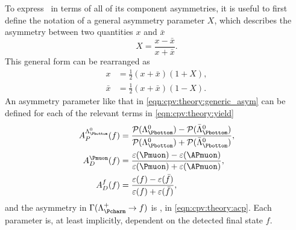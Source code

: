 To express \ARaw\ in terms of all of its component asymmetries, it is useful to 
first define the notation of a general asymmetry parameter $X$, which describes 
the asymmetry between two quantities $x$ and $\bar{x}$
\begin{equation}
  X = \frac{x - \bar{x}}{x + \bar{x}}.
  \label{eqn:cpv:theory:generic_asym}
\end{equation}
This general form can be rearranged as
\begin{align}
  x &= \frac{1}{2}(x + \bar{x})(1 + X),\label{eqn:cpv:theory:asym_form_one}\\
  \bar{x} &= \frac{1}{2}(x + \bar{x})(1 - X).\label{eqn:cpv:theory:asym_form_two}
\end{align}
An asymmetry parameter like that in \cref{eqn:cpv:theory:generic_asym} can be defined for each of the relevant terms in 
\cref{eqn:cpv:theory:yield}
\begin{align*}
  \APLb(f) &= \frac{%
    \prob(\PLambdab) - \prob(\APLambdab)
  }{%
    \prob(\PLambdab) + \prob(\APLambdab)
  },\\
  \ADmu(f) &= \frac{%
    \eff(\Pmuon) - \eff(\APmuon)
  }{%
    \eff(\Pmuon) + \eff(\APmuon)
  },\\
  \ADf(f)  &= \frac{%
    \eff(f) - \eff(\bar{f})
  }{%
    \eff(f) + \eff(\bar{f})
  },
\end{align*}
and the asymmetry in $\Gamma(\LcTof)$ is \ACP, in \cref{eqn:cpv:theory:acp}.
Each parameter is, at least implicitly, dependent on the detected final state 
$f$.

